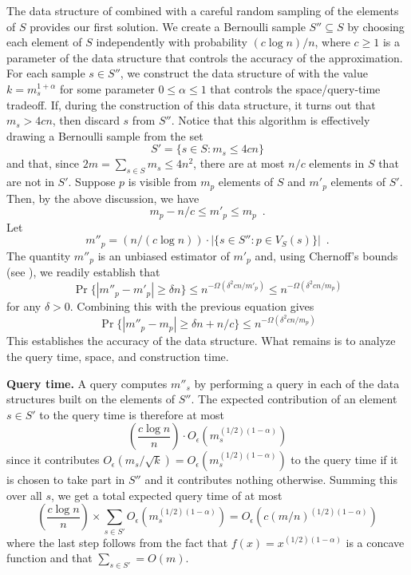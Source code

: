 \documentclass{patmorin}
\newcommand{\Oe}{O_\epsilon}
\begin{document}
The data structure of  combined with a careful
random sampling of the elements of $S$ provides our first solution.
We create a Bernoulli sample $S''\subseteq S$ by choosing each element
of $S$ independently with probability $(c\log n)/n$, where $c \ge 1$
is a parameter of the data structure that controls the accuracy of
the approximation.  For each sample $s\in S''$, we construct the data
structure of  with the value $k=m_s^{1+\alpha}$
for some parameter $0\le\alpha \le 1$ that controls the space/query-time
tradeoff.  If, during the construction of this data structure, it turns
out that $m_s > 4cn$, then discard $s$ from $S''$.  Notice that this
algorithm is effectively drawing a Bernoulli sample from the set
\[
  S' = \{ s\in S : m_s \le 4cn \}
\]
and that, since $2m=\sum_{s\in S} m_s \le 4n^2$, there are at most $n/c$
elements in $S$ that are not in $S'$.
Suppose $p$ is visible from $m_p$ elements of $S$ and $m'_p$ elements of
$S'$.  Then, by the above discussion, we have
\[
     m_p - n/c \le m'_p \le m_p  \enspace .
\]
Let
\[
   m''_p= (n/(c\log n))\cdot |\{s\in S'': p\in V_S(s)\}| \enspace .
\]
The quantity $m''_p$ is an unbiased estimator of $m'_p$ and, using
Chernoff's bounds (see ), we readily establish that
\[
   \Pr\{|m''_p - m'_p| \ge \delta n\} \le n^{-\Omega(\delta^2cn/m'_p)}
           \le n^{-\Omega(\delta^2cn/m_p)}
\]
for any $\delta > 0$. Combining this with the previous equation gives
\[
   \Pr\{|m''_p - m_p| \ge \delta n + n/c\} \le n^{-\Omega(\delta^2 cn/m_p)} 
\]
This establishes the accuracy of the data structure.  What remains is to
analyze the query time, space, and construction time.

\noindent\textbf{Query time.} A query computes $m''_s$ by performing
a query in each of the data structures built on the elements of $S''$.
The expected contribution of an element $s\in S'$ to the query time is
therefore at most
\[
    \left(\frac{c\log n}{n}\right)\cdot\Oe\left(m_s^{(1/2)(1-\alpha)}\right)
\]
since it contributes $\Oe(m_s/\sqrt{k})=\Oe(m_s^{(1/2)(1-\alpha)})$ to the
query time if it is chosen to take part in $S''$ and it contributes
nothing otherwise.  Summing this over all $s$, we get a total expected query
time of at most
\[
     \left(\frac{c\log n}{n}\right)
         \times\sum_{s\in S'}\Oe\left(m_s^{(1/2)(1-\alpha)}\right)
     = \Oe(c(m/n)^{(1/2)(1-\alpha)})
\]
where the last step follows from the fact that $f(x)=x^{(1/2)(1-\alpha)}$
is a concave function and that $\sum_{s\in S'} = O(m)$.
\end{document}
